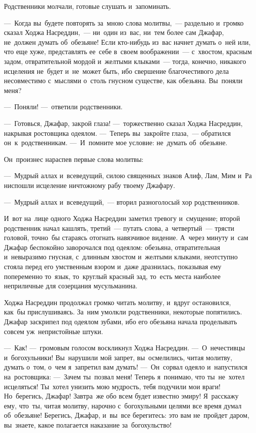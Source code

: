 \documentclass[12pt,a4paper]{book}
\begin{document}
Родственники молчали, готовые слушать и~запоминать.

—~Когда вы~будете повторять за~мною слова молитвы,~— раздельно и~громко сказал Ходжа Насреддин,~— ни~один из~вас, ни~тем более сам Джафар, не~должен думать об~обезьяне! Если кто-нибудь из~вас начнет думать о~ней или, что еще хуже, представлять ее~себе в~своем воображении~— с~хвостом, красным задом, отвратительной мордой и~желтыми клыками~— тогда, конечно, никакого исцеления не~будет и~не~может быть, ибо свершение благочестивого дела несовместимо с~мыслями о~столь гнусном существе, как обезьяна. Вы~поняли меня?

—~Поняли! —~ответили родственники.

—~Готовься, Джафар, закрой глаза! —~торжественно сказал Ходжа Насреддин, накрывая ростовщика одеялом. —~Теперь вы~закройте глаза,~— обратился он~к~родственникам. —~И~помните мое условие: не~думать об~обезьяне.

Он~произнес нараспев первые слова молитвы:

—~Мудрый аллах и~всеведущий, силою священных знаков Алиф, Лам, Мим и~Ра ниспошли исцеление ничтожному рабу твоему Джафару.

—~Мудрый аллах и~всеведущий,~— вторил разноголосый хор родственников.

И~вот на~лице одного Ходжа Насреддин заметил тревогу и~смущение; второй родственник начал кашлять, третий~— путать слова, а~четвертый~— трясти головой, точно~бы стараясь отогнать навязчивое видение. А~через минуту и~сам Джафар беспокойно заворочался под одеялом: обезьяна, отвратительная и~невыразимо гнусная, с~длинным хвостом и~желтыми клыками, неотступно стояла перед его умственным взором и~даже дразнилась, показывая ему попеременно то~язык, то~круглый красный зад, то~есть места наиболее неприличные для созерцания мусульманина.

Ходжа Насреддин продолжал громко читать молитву, и~вдруг остановился, как~бы прислушиваясь. За~ним умолкли родственники, некоторые попятились. Джафар заскрипел под одеялом зубами, ибо его обезьяна начала проделывать совсем уж~непристойные штуки.

—~Как! —~громовым голосом воскликнул Ходжа Насреддин. —~О~нечестивцы и~богохульники! Вы~нарушили мой запрет, вы~осмелились, читая молитву, думать о~том, о~чем я~запретил вам думать! —~Он~сорвал одеяло и~напустился на~ростовщика: —~Зачем ты~позвал меня! Теперь я~понимаю, что ты~не~хотел исцеляться! Ты~хотел унизить мою мудрость, тебя подучили мои враги! Но~берегись, Джафар! Завтра~же обо всем будет известно эмиру! Я~расскажу ему, что~ты, читая молитву, нарочно с~богохульными целями все время думал об~обезьяне! Берегись, Джафар, и~вы~все берегитесь: это вам не~пройдет даром, вы~знаете, какое полагается наказание за~богохульство!
\end{document}
